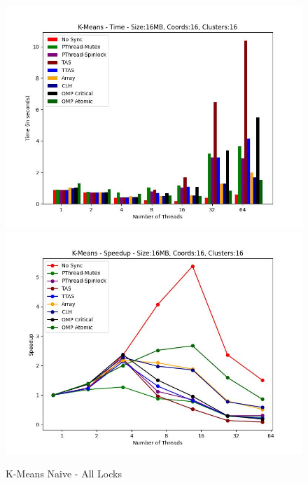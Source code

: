 \documentclass[../final_report.tex]{subfiles}
\begin{document}
\begin{figure}[H]
    \centering
        \includegraphics[scale=0.4]{outFilesAffinityMouliko/plots/kmeans_locks_all.jpg}
        \includegraphics[scale=0.4]{outFilesAffinityMouliko/plots/kmeans_locks_all_speedup.jpg}
    \caption{K-Means Naive - All Locks}
    \label{fig:K-Means Naive - All Locks}
\end{figure}
\end{document}
